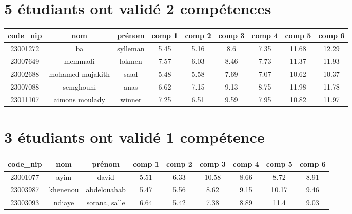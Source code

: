 \documentclass{article}%
\begin{document}
%
\section{5 étudiants ont validé 2 compétences}%
\label{sec:5tudiantsontvalid2comptences}%
\begin{tabular}{|c|c|c|c|c|c|c|c|c|}%
\hline%
\rowcolor{bleu}%
code\_nip&nom&prénom&comp 1&comp 2&comp 3&comp 4&comp 5&comp 6\\%
\hline%
23001272&ba&sylleman&5.45&5.16&8.6&7.35&11.68&12.29\\%
\hline%
23007649&memmadi&lokmen&7.57&6.03&8.46&7.73&11.37&11.93\\%
\hline%
23002688&mohamed mujakith&saad&5.48&5.58&7.69&7.07&10.62&10.37\\%
\hline%
23007088&semghouni&anas&6.62&7.15&9.13&8.75&11.98&11.78\\%
\hline%
23011107&aimons moulady&winner&7.25&6.51&9.59&7.95&10.82&11.97\\%
\hline%
\end{tabular}

%
\section{3 étudiants ont validé 1 compétence}%
\label{sec:3tudiantsontvalid1comptence}%
\begin{tabular}{|c|c|c|c|c|c|c|c|c|}%
\hline%
\rowcolor{bleu}%
code\_nip&nom&prénom&comp 1&comp 2&comp 3&comp 4&comp 5&comp 6\\%
\hline%
23001077&ayim&david&5.51&6.33&10.58&8.66&8.72&8.91\\%
\hline%
23003987&khenenou&abdelouahab&5.47&5.56&8.62&9.15&10.17&9.46\\%
\hline%
23003093&ndiaye&sorana, salle&6.64&5.42&7.38&8.89&11.4&9.03\\%
\hline%
\end{tabular}

%
\end{document}
